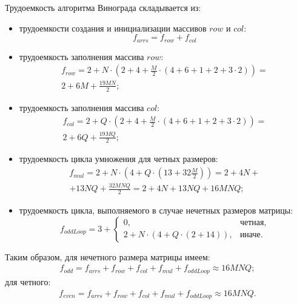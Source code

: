 Трудоемкость алгоритма Винограда складывается из:
\begin{itemize}
	\item трудоемкости создания и инициализации массивов $row$ и $col$:
	\begin{equation}
		\label{eqn:f-arrs}
		f_{arrs} = f_{row} + f_{col}
	\end{equation}
	\item трудоемкость заполнения массива $row$:
	\begin{equation}
		\begin{gathered}
			f_{row} = 2 + N \cdot (2 + 4 + \frac{M}{2} \cdot (4 + 6 + 1 + 2 + 3 \cdot 2)) = \\
			2 + 6M + \frac{19MN}{2};
		\end{gathered}
	\end{equation}
	\item трудоемкость заполнения массива $col$:
	\begin{equation}
		\begin{gathered}
			f_{col} = 2 + Q \cdot (2 + 4 + \frac{M}{2} \cdot (4 + 6 + 1 + 2 + 3 \cdot 2)) = \\
			2 + 6Q + \frac{19MQ}{2};
		\end{gathered}
	\end{equation}
	\item трудоемкость цикла умножения для четных размеров:
	\begin{equation}
		\begin{gathered}
			f_{mul} = 2 + N \cdot (4 + Q \cdot (13 + 32\frac{M}{2})) = 2 + 4N + \\
			+ 13NQ + \frac{32MNQ}{2} = 2 + 4N + 13NQ + 16MNQ;
		\end{gathered}
	\end{equation}
	\item трудоемкость цикла, выполняемого в случае нечетных размеров матрицы:
	\begin{equation}
		f_{oddLoop} = 3 + 
		\begin{cases}
			0, & \text{четная,} \\
			2 + N \cdot (4 + Q \cdot (2 + 14)), & \text{иначе.}
		\end{cases}
	\end{equation}
\end{itemize}
Таким образом, для нечетного размера матрицы имеем:
\begin{multline}
	f_{odd} = f_{arrs} + f_{row} + f_{col} + f_{mul} + f_{oddLoop}  \approx 16MNQ;
\end{multline}
для четного:
\begin{multline}
	f_{even} = f_{arrs} + f_{row} + f_{col} + f_{mul} + f_{oddLoop} \approx 16MNQ.
\end{multline}

